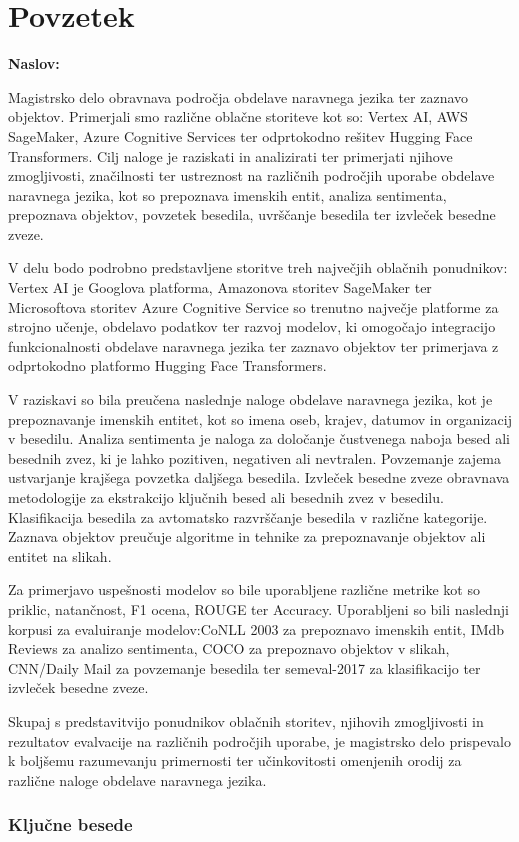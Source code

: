 \chapter*{Povzetek}

\noindent\textbf{Naslov:} \ttitle
\bigskip

Magistrsko delo obravnava področja obdelave naravnega jezika ter zaznavo objektov. Primerjali smo različne oblačne storiteve kot so: Vertex AI, AWS SageMaker, Azure Cognitive Services ter odprtokodno rešitev Hugging Face Transformers. Cilj naloge je raziskati in analizirati ter primerjati njihove zmogljivosti, značilnosti ter ustreznost na različnih področjih uporabe obdelave naravnega jezika, kot so prepoznava imenskih entit, analiza sentimenta, prepoznava objektov, povzetek  besedila, uvrščanje besedila ter izvleček besedne zveze.

V delu bodo podrobno predstavljene storitve treh največjih oblačnih ponudnikov: Vertex AI je Googlova platforma, Amazonova storitev SageMaker ter Microsoftova storitev Azure Cognitive Service so trenutno največje platforme za strojno učenje, obdelavo podatkov ter razvoj modelov, ki omogočajo integracijo funkcionalnosti obdelave naravnega jezika ter zaznavo objektov ter primerjava z odprtokodno platformo Hugging Face Transformers.

V raziskavi so bila preučena naslednje naloge obdelave naravnega jezika, kot je prepoznavanje imenskih entitet, kot so imena oseb, krajev, datumov in organizacij v besedilu.
Analiza sentimenta je naloga za določanje čustvenega naboja besed ali besednih zvez, ki je lahko pozitiven, negativen ali nevtralen. Povzemanje zajema ustvarjanje krajšega povzetka daljšega besedila. Izvleček besedne zveze obravnava metodologije za ekstrakcijo ključnih besed ali besednih zvez v besedilu. 
Klasifikacija besedila za avtomatsko razvrščanje besedila v različne kategorije. Zaznava objektov preučuje algoritme in tehnike za prepoznavanje objektov ali entitet na slikah.

Za primerjavo uspešnosti modelov so bile uporabljene različne metrike kot so priklic, natančnost, F1 ocena, ROUGE ter Accuracy. Uporabljeni so bili naslednji korpusi za  evaluiranje modelov:CoNLL 2003 za prepoznavo imenskih entit, IMdb Reviews za analizo sentimenta, COCO za prepoznavo objektov v slikah, CNN/Daily Mail za povzemanje besedila ter semeval-2017 za klasifikacijo ter izvleček besedne zveze.

Skupaj s predstavitvijo ponudnikov oblačnih storitev, njihovih zmogljivosti in rezultatov evalvacije na različnih področjih uporabe, je magistrsko delo prispevalo k boljšemu razumevanju primernosti ter učinkovitosti omenjenih orodij za različne naloge obdelave naravnega jezika.

\subsection*{Ključne besede}
\textit{\tkeywords}
\clearemptydoublepage 